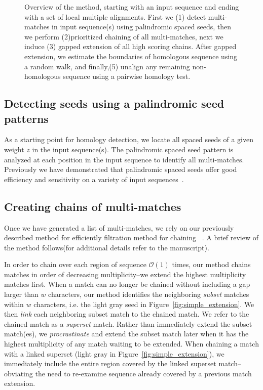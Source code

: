 \documentclass{llncs}
\begin{document}
\begin{figure}[t]
\begin{center}
\end{center}
\caption{Overview of the method, starting with an input sequence and ending with a set of local multiple alignments. First we (1) detect multi-matches in input sequence(s) using palindromic spaced seeds, then we perform (2)prioritized chaining of all multi-matches, next we induce (3) gapped extension of all high scoring chains. After gapped extension, we estimate the boundaries of homologous sequence using a random walk, and finally,(5) unalign any remaining non-homologous sequence using a pairwise homology test. }
\end{figure}



\subsection{Detecting seeds using a palindromic seed patterns}

As a starting point for homology detection, we locate all spaced seeds of a given weight $z$ in the input sequence(s). The palindromic spaced seed pattern is analyzed at each position in the input sequence to identify all multi-matches.  Previously we have demonstrated that palindromic spaced seeds offer good efficiency and sensitivity on a variety of input sequences~\cite{ref-procrast}.

\subsection{Creating chains of multi-matches}

Once we have generated a list of multi-matches, we rely on our previously described method for efficiently filtration method for chaining ~\cite{ref-procrast}. A brief review of the method follows(for additional details refer to the manuscript).

In order to chain over each region of sequence $\mathcal{O}(1)$ times,
our method chains matches in order of decreasing multiplicity--we
extend the highest multiplicity matches first. When a match can no
longer be chained without including a gap larger than $w$
characters, our method identifies the neighboring \textit{subset}
matches within $w$ characters, i.e. the light gray seed in
Figure~\ref{fig:simple_extension}. We then \textit{link} each
neighboring subset match to the chained match. We refer to the
chained match as a \textit{superset} match. Rather than immediately
extend the subset match(es), we \textit{procrastinate} and extend
the subset match later when it has the highest multiplicity of any
match waiting to be extended. When chaining a match with a linked
superset (light gray in Figure~\ref{fig:simple_extension}), we
immediately include the entire region covered by the linked superset
match--obviating the need to re-examine sequence already covered by
a previous match extension.
\end{document}
